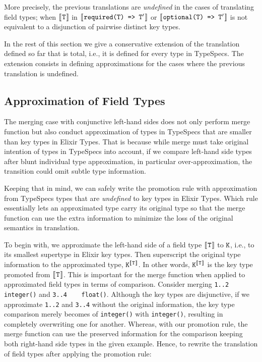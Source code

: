 \documentclass{article}
\begin{document}
More precisely, the previous translations are \textit{undefined} in the cases of translating field types; when $[\![\hspace{.07em}\texttt{T}\hspace{.07em}]\!]$ in $[\![\hspace{.07em}\texttt{required(\texttt{T}) => $\texttt{T}^{\prime}$}\hspace{.07em}]\!]$ or $[\![\hspace{.07em}\texttt{optional(\texttt{T}) => $\texttt{T}^{\prime}$}\hspace{.07em}]\!]$ is not equivalent to a disjunction of pairwise distinct key types.

In the rest of this section we give a conservative extension of the translation defined so far that is total, i.e., it is defined for every type in TypeSpecs. 
The extension consists in defining approximations for the cases where the previous translation is undefined.

\subsection{Approximation of Field Types}

The merging case with conjunctive left-hand sides does not only perform merge function but also conduct approximation of types in TypeSpecs that are smaller than key types in Elixir Types.
That is because while merge must take original intention of types in TypeSpecs into account, if we compare left-hand side types after blunt individual type approximation, in particular over-approximation, the transition could omit subtle type information.

Keeping that in mind, we can safely write the promotion rule with approximation from TypeSpecs types that are \textit{undefined} to key types in Elixir Types.
Which rule essentially lets an approximated type carry its original type so that the merge function can use the extra information to minimize the loss of the original semantics in translation.

To begin with, we approximate the left-hand side of a field type $[\![\hspace{.07em}\texttt{T}\hspace{.07em}]\!]$ to $\texttt{K}$, i.e., to its smallest supertype in Elixir key types.
Then superscript the original type information to the approximated type, $\texttt{K}^{[\![\hspace{.07em}\texttt{T}\hspace{.07em}]\!]}$.
In other words, $\texttt{K}^{[\![\hspace{.07em}\texttt{T}\hspace{.07em}]\!]}$ is the key type promoted from $[\![\hspace{.07em}\texttt{T}\hspace{.07em}]\!]$. 
This is important for the merge function when applied to approximated field types in terms of comparison.
Consider merging \texttt{1..2\,\,\fto\,\,integer()} and \texttt{3..4\,\,\fto\,\,float()}. 
Although the key types are disjunctive, if we approximate \texttt{1..2} and \texttt{3..4} without the original information, the key type comparison merely becomes of \texttt{integer()} with \texttt{integer()}, resulting in completely overwriting one for another.
Whereas, with our promotion rule, the merge function can use the preserved information for the comparison keeping both right-hand side types in the given example.
Hence, to rewrite the translation of field types after applying the promotion rule:
\end{document}
